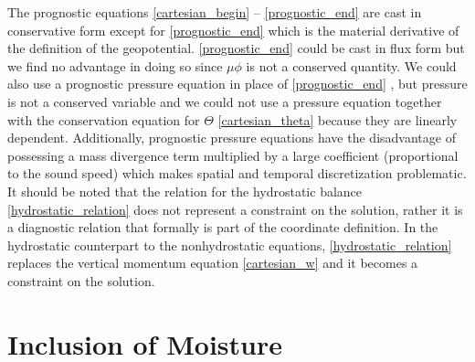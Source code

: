 The prognostic equations \eqref{cartesian_begin} --
\eqref{prognostic_end} are cast in conservative form except for
\eqref{prognostic_end} which is the material derivative of the
definition of the geopotential.  \eqref{prognostic_end} could be cast in
flux form but we find no advantage in doing so since $\mu \phi$ is not a
conserved quantity.  We could also use a prognostic pressure equation in
place of \eqref{prognostic_end} \citep[see][]{laprise92}, but pressure is
not a conserved variable and we could not use a pressure equation
together with
the conservation equation for $\Theta$ \eqref{cartesian_theta} because
they are linearly dependent.  
Additionally, prognostic pressure
equations have the disadvantage of possessing a mass divergence term
multiplied by a large coefficient (proportional to the sound speed)
which makes spatial and temporal discretization problematic.
It should be noted that the relation for the hydrostatic
balance \eqref{hydrostatic_relation} does not represent a constraint on
the solution, rather it is a diagnostic relation that formally is part
of the coordinate definition.  In the hydrostatic counterpart to the
nonhydrostatic equations, \eqref{hydrostatic_relation} replaces the
vertical momentum equation \eqref{cartesian_w} and it becomes a
constraint on the solution.

\section{Inclusion of Moisture}

